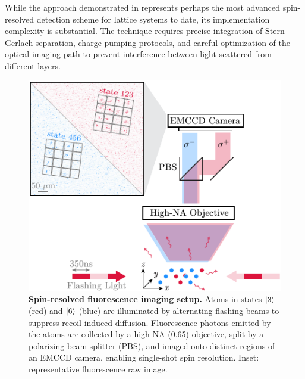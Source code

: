 While the approach demonstrated in \cite{koepsell_robust_2020} represents perhaps the most advanced spin-resolved detection scheme for lattice systems to date, its implementation complexity is substantial. The technique requires precise integration of Stern-Gerlach separation, charge pumping protocols, and careful optimization of the optical imaging path to prevent interference between light scattered from different layers. 






\begin{figure}
    \centering
    \includegraphics{fig-ai/spin-proc.pdf}
    \caption[Spin-resolved fluorescence imaging setup]{
	\textbf{Spin-resolved fluorescence imaging setup.} 
	Atoms in states $\left| 3 \right\rangle$ (red) and $\left| 6 \right\rangle$ (blue) are illuminated by alternating flashing beams to suppress recoil-induced diffusion. Fluorescence photons emitted by the atoms are collected by a high-NA (0.65) objective, split by a polarizing beam splitter (PBS), and imaged onto distinct regions of an EMCCD camera, enabling single-shot spin resolution. Inset: representative fluorescence raw image.
	}
    \label{fig:spin-proc}
\end{figure}


